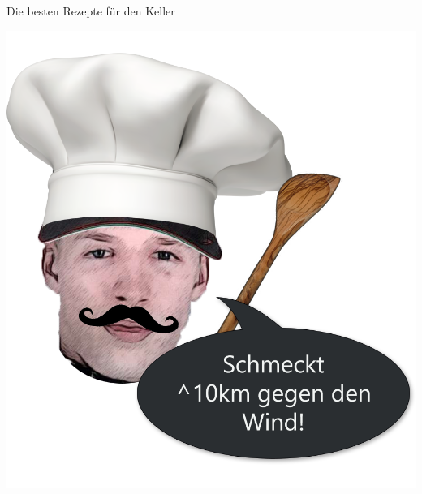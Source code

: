 
\pagecolor{proMainBg}
\selectfont

\begin{titlepage}
	\begin{center}
		\textcolor{proDefaultFont}{
			\Huge
			\thetitle
		}
		\par
		\textcolor{proStats}{
			\Large
			Die besten Rezepte für den Keller
		}
	\end{center}

	\hspace{10mm}

	\begin{center}
		\includegraphics[width=\textwidth]{_assets/Falk/DerHurensohn-3.png}
	\end{center}

\end{titlepage}